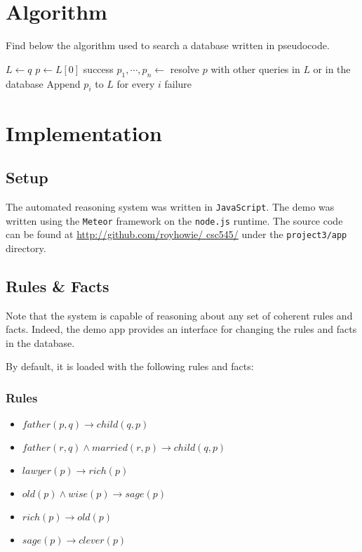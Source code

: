 \documentclass{article}
\begin{document}
\section{Algorithm}
  \label{alg-pseudo-code}
  Find below the algorithm used to search a database written in pseudocode.
  \begin{algorithm}
    \begin{algorithmic}[1]
      \State $L \gets q$ 
        \State $p\gets L[0]$
          \Return success
        \EndIf
        \State $p_1,\cdots,p_n \gets$ resolve $p$ with other queries in $L$ or
          in the database
        \State Append $p_i$ to $L$ for every $i$
      \EndWhile
      \State \Return failure
    \EndProcedure
    \end{algorithmic}
  \end{algorithm}

\section{Implementation}
  \subsection{Setup}
    The automated reasoning system was written in \texttt{JavaScript}. The demo
    was written using the \texttt{Meteor} framework on the \texttt{node.js}
    runtime. The source code can be found at \url{http://github.com/royhowie/
    csc545/} under the \texttt{project3/app} directory.

  \subsection{Rules \& Facts}
    Note that the system is capable of reasoning about any set of coherent rules
    and facts. Indeed, the demo app provides an interface for changing the rules
    and facts in the database.

    By default, it is loaded with the following rules and facts:
    \subsubsection{Rules}
      \begin{itemize}
        \item $father(p,q)\rightarrow child(q,p)$
        \item $father(r,q)\wedge married(r,p)\rightarrow child(q,p)$
        \item $lawyer(p)\rightarrow rich(p)$
        \item $old(p)\wedge wise(p)\rightarrow sage(p)$
        \item $rich(p)\rightarrow old(p)$
        \item $sage(p)\rightarrow clever(p)$
      \end{itemize}
\end{document}
